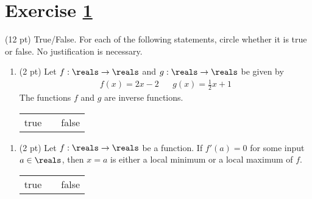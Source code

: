 %
%
%
%


\section{Exercise \ref{sec : Math112 Spring2022 Exam1 Q1}}
\label{sec : Math112 Spring2022 Exam1 Q1}

(12 pt) True/False. For each of the following statements, circle whether it is true or false. No justification is necessary.
\begin{enumerate}[label=(\alph*)]
\item\label{itm : E1Q1a} (2 pt) Let $f : \reals \rightarrow \reals$ and $g : \reals \rightarrow \reals$ be given by
\begin{align*}
f(x)
=
2 x - 2
&&
g(x)
=
\frac{1}{2} x + 1
\end{align*}
The functions $f$ and $g$ are inverse functions.
\begin{center}
\begin{tabular}{c c c}
true	&	\hspace{1in}	&	false
\end{tabular}
\end{center}
\end{enumerate}


\begin{enumerate}[resume,label=(\alph*)]
\item\label{itm : E1Q1b} (2 pt) Let $f : \reals \rightarrow \reals$ be a function. If $f'(a) = 0$ for some input $a \in \reals$, then $x = a$ is either a local minimum or a local maximum of $f$.
\begin{center}
\begin{tabular}{c c c}
true	&	\hspace{1in}	&	false
\end{tabular}
\end{center}
\end{enumerate}

